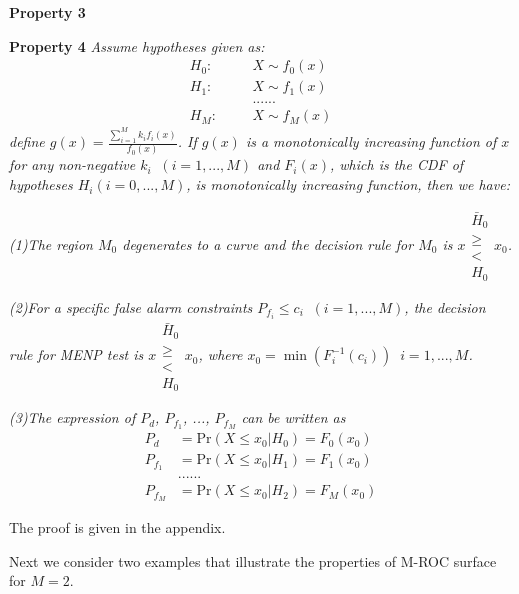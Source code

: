 \documentclass[12pt,journal,a4paper,twoside,onecolumn]{IEEEtran}
\begin{document}
\begin{spacing}{2.5}
\noindent \textbf{Property 3}

\noindent \textbf{Property 4}
\noindent \textit{
  \noindent Assume hypotheses given as:
}
\begin{equation}
\begin{split}
H_0:\;\;\;\;\;\;&X \sim f_0(x)\\
H_1:\;\;\;\;\;\;&X \sim f_1(x)\\
  &......\\
H_M:\;\;\;\;\;\;&X \sim f_M(x)
\end{split}
\end{equation}
\textit{
  define $g(x) = \frac{\sum_{i=1}^{M}k_if_i(x)}{f_0(x)}$. If $g(x)$ is a monotonically increasing function of $x$ for any non-negative $k_i\;\;(i = 1, ..., M)$ and $F_i(x)$, which is the CDF of hypotheses $H_i (i = 0, ..., M)$, is monotonically increasing function, then we have:}
  
\textit{(1)The region $M_0$ degenerates to a curve and the decision rule for $M_0$ is $x \substack{\bar{H}_0 \\ \geq \\ < \\H_0} x_0$.}

\textit{(2)For a specific false alarm constraints $P_{f_i} \leq c_i\;\;(i = 1, ..., M)$, the decision rule for MENP test is $x \substack{\bar{H}_0 \\ \geq \\ < \\H_0} x_0$, where $x_0 = \min(F_i^{-1}(c_i))\;\;i = 1, ..., M$.}

\textit{(3)The expression of $P_d$, $P_{f_1}$, ..., $P_{f_M}$ can be written as}
\begin{equation}
\label{equ: chi pd}
  \begin{split}
    P_d &= \text{Pr}(X \leq x_0 | H_0) = F_0(x_0)\\
        P_{f_1} &= \text{Pr}(X \leq x_0 | H_1) = F_1(x_0)\\
        &......\\
            P_{f_M} &= \text{Pr}(X \leq x_0 | H_2) = F_M(x_0)
  \end{split}
\end{equation}

The proof is given in the appendix.

Next we consider two examples that illustrate the properties of M-ROC surface for $M = 2$.


\end{spacing}
\end{document}

